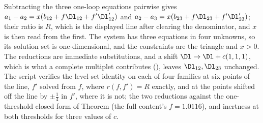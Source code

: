 Subtracting the three one-loop equations pairwise gives $a_{1} - a_{2} = x(b_{12} + f\Dl_{12} + f'\Dl'_{12})$ and $a_{2} - a_{3} = x(b_{23} + f\Dl_{23} + f'\Dl'_{23})$; their ratio is $R$, which is the displayed line after clearing the denominator, and $x$ is then read from the first. The system has three equations in four unknowns, so its solution set is one-dimensional, and the constraints are the triangle and $x > 0$. The reductions are immediate substitutions, and a shift $\Dl \to \Dl + c(1,1,1)$, which is what a complete multiplet contributes (), leaves $\Dl_{12}, \Dl_{23}$ unchanged. The script verifies the level-set identity on each of four families at six points of the line, $f'$ solved from $f$, where $r(f, f') = R$ exactly, and at the points shifted off the line by $\pm\tfrac14$ in $f'$, where it is not; the two reductions against the one-threshold closed form of Theorem  (the full content's $f = 1.0116$), and inertness at both thresholds for three values of $c$.

